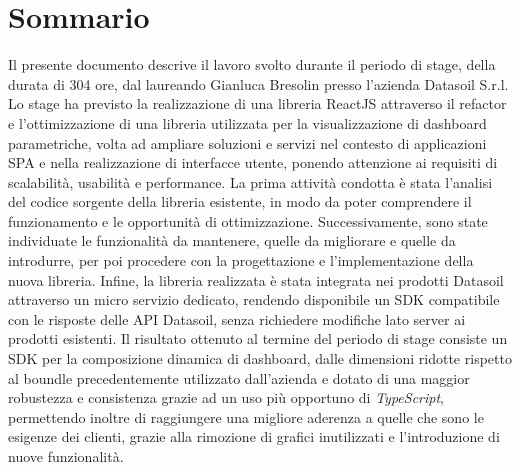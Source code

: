 \cleardoublepage
{}
{}
\begingroup
\let\clearpage\relax
\let\cleardoublepage\relax
\chapter*{Sommario}

Il presente documento descrive il lavoro svolto durante il periodo di stage, della durata di 304 ore, dal laureando Gianluca Bresolin
presso l'azienda Datasoil S.r.l. Lo stage ha previsto la realizzazione di una libreria ReactJS attraverso il refactor
e l'ottimizzazione di una libreria utilizzata per la visualizzazione di dashboard parametriche, volta ad ampliare soluzioni e servizi
nel contesto di applicazioni SPA e nella realizzazione di interfacce utente, ponendo attenzione ai requisiti di scalabilità,
usabilità e performance. \newline
La prima attività condotta è stata l'analisi del codice sorgente della libreria esistente, in modo da poter comprendere il funzionamento e le opportunità
di ottimizzazione. Successivamente, sono state individuate le funzionalità da mantenere, quelle da migliorare e quelle da introdurre,
per poi procedere con la progettazione e l'implementazione della nuova libreria. \newline
Infine, la libreria realizzata è stata integrata nei prodotti Datasoil attraverso un micro servizio dedicato, rendendo disponibile un SDK
compatibile con le risposte delle API Datasoil, senza richiedere modifiche lato server ai prodotti esistenti. \newline
Il risultato ottenuto al termine del periodo di stage consiste un SDK per la composizione dinamica di dashboard, dalle dimensioni ridotte rispetto
al boundle precedentemente utilizzato dall'azienda e dotato di una maggior robustezza e consistenza grazie ad un uso più opportuno di \textit{TypeScript},
permettendo inoltre di raggiungere una migliore aderenza a quelle che sono le esigenze dei clienti, grazie alla rimozione di grafici inutilizzati e
l'introduzione di nuove funzionalità.


\endgroup
\vfill
